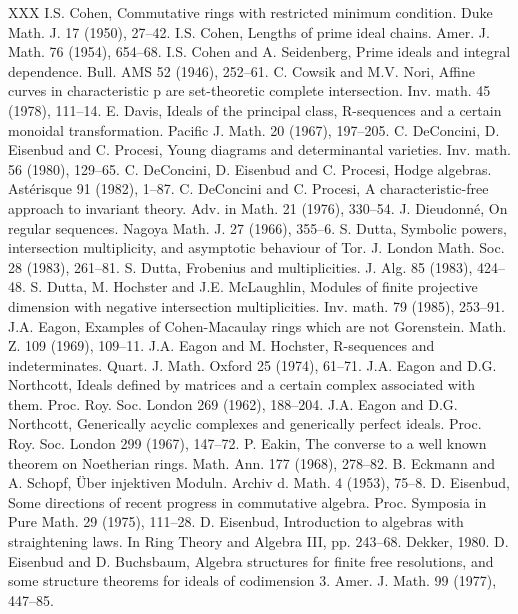 \begin{thebibliography}{XXX}
 I.S. Cohen, Commutative rings with restricted minimum condition. Duke Math. J. 17 (1950), 27--42.
 I.S. Cohen, Lengths of prime ideal chains. Amer. J. Math. 76 (1954), 654--68.
 I.S. Cohen and A. Seidenberg, Prime ideals and integral dependence. Bull. AMS 52 (1946), 252--61.
 C. Cowsik and M.V. Nori, Affine curves in characteristic p are set-theoretic complete intersection. Inv. math. 45 (1978), 111--14.
 E. Davis, Ideals of the principal class, R-sequences and a certain monoidal transformation. Pacific J. Math. 20 (1967), 197--205.
 C. DeConcini, D. Eisenbud and C. Procesi, Young diagrams and determinantal varieties. Inv. math. 56 (1980), 129--65.
 C. DeConcini, D. Eisenbud and C. Procesi, Hodge algebras. Ast\'erisque 91 (1982), 1--87.
 C. DeConcini and C. Procesi, A characteristic-free approach to invariant theory. Adv. in Math. 21 (1976), 330--54.
 J. Dieudonn\'e, On regular sequences. Nagoya Math. J. 27 (1966), 355--6.
 S. Dutta, Symbolic powers, intersection multiplicity, and asymptotic behaviour of Tor. J. London Math. Soc. 28 (1983), 261--81.
 S. Dutta, Frobenius and multiplicities. J. Alg. 85 (1983), 424--48.
 S. Dutta, M. Hochster and J.E. McLaughlin, Modules of finite projective dimension with negative intersection multiplicities. Inv. math. 79 (1985), 253--91.
 J.A. Eagon, Examples of Cohen-Macaulay rings which are not Gorenstein. Math. Z. 109 (1969), 109--11.
 J.A. Eagon and M. Hochster, R-sequences and indeterminates. Quart. J. Math. Oxford 25 (1974), 61--71.
 J.A. Eagon and D.G. Northcott, Ideals defined by matrices and a certain complex associated with them. Proc. Roy. Soc. London 269 (1962), 188--204.
 J.A. Eagon and D.G. Northcott, Generically acyclic complexes and generically perfect ideals. Proc. Roy. Soc. London 299 (1967), 147--72.
 P. Eakin, The converse to a well known theorem on Noetherian rings. Math. Ann. 177 (1968), 278--82.
 B. Eckmann and A. Schopf, \"Uber injektiven Moduln. Archiv d. Math. 4 (1953), 75--8.
 D. Eisenbud, Some directions of recent progress in commutative algebra. Proc. Symposia in Pure Math. 29 (1975), 111--28.
 D. Eisenbud, Introduction to algebras with straightening laws. In Ring Theory and Algebra III, pp. 243--68. Dekker, 1980.
 D. Eisenbud and D. Buchsbaum, Algebra structures for finite free resolutions, and some structure theorems for ideals of codimension 3. Amer. J. Math. 99 (1977), 447--85.

\end{thebibliography}
